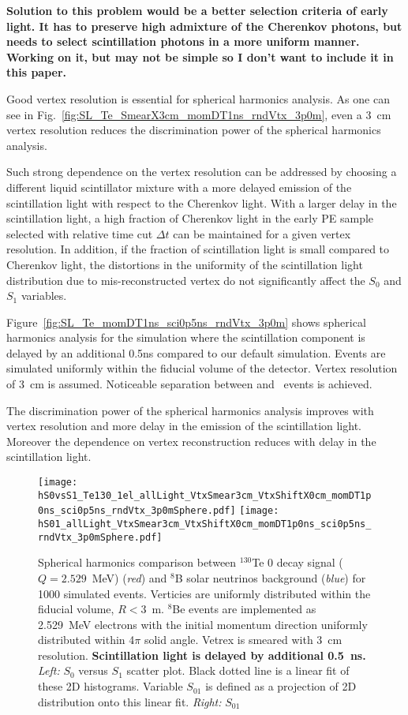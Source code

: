 {\bf Solution to this problem would be a better selection criteria of
  early light. It has to preserve high admixture of the Cherenkov
  photons, but needs to select scintillation photons in a more uniform
  manner. Working on it, but may not be simple so I don't want to
  include it in this paper.}

Good vertex resolution is essential for spherical harmonics analysis. As one can see in Fig.~\ref{fig:SL_Te_SmearX3cm_momDT1ns_rndVtx_3p0m}, even a 3~cm vertex resolution reduces the discrimination power of the spherical harmonics analysis.

Such strong dependence on the vertex resolution can be
addressed by choosing a different liquid scintillator mixture with a
more delayed emission of the scintillation light with respect to the Cherenkov light. With a larger delay in the scintillation light, a high fraction of Cherenkov light in the early PE sample selected with relative time cut $\Delta t$ can be maintained for a given vertex resolution. In addition, if the fraction of scintillation light is small compared to Cherenkov light, the distortions in the uniformity of the scintillation light distribution due to mis-reconstructed vertex do not significantly affect the $S_0$ and $S_1$ variables.

Figure~\ref{fig:SL_Te_momDT1ns_sci0p5ns_rndVtx_3p0m} shows
spherical harmonics analysis for the simulation where the
scintillation component is delayed by an additional 0.5ns compared to our default simulation. Events are simulated uniformly within the fiducial volume of the detector. Vertex resolution of 3~cm is assumed. Noticeable separation between \nbb and \B~events is achieved.

The discrimination power of the spherical harmonics analysis improves with vertex resolution and more delay in the emission of the scintillation light. Moreover the dependence on vertex reconstruction reduces with delay in the scintillation light. 

\begin{figure*}[h]
  \centering
  \texttt{[image: hS0vsS1\_Te130\_1el\_allLight\_VtxSmear3cm\_VtxShiftX0cm\_momDT1p0ns\_sci0p5ns\_rndVtx\_3p0mSphere.pdf]}
  \texttt{[image: hS01\_allLight\_VtxSmear3cm\_VtxShiftX0cm\_momDT1p0ns\_sci0p5ns\_rndVtx\_3p0mSphere.pdf]}
  \caption{Spherical harmonics comparison between $^{130}$Te 0{\nbb}
    decay signal ($Q=2.529$~MeV) (\emph{red}) and $^{8}$B solar
    neutrinos background (\emph{blue}) for 1000 simulated
    events. Verticies are uniformly distributed within the fiducial
    volume, $R<3$~m. $^8$Be events are implemented as 2.529~MeV
    electrons with the initial momentum direction uniformly
    distributed within 4$\pi$ solid angle. Vetrex is smeared with 3~cm
    resolution. {\bf Scintillation light is delayed by additional
      0.5~ns.} \emph{Left:} $S_0$ versus $S_1$ scatter plot. Black dotted
    line is a linear fit of these 2D histograms. Variable $S_{01}$ is
    defined as a projection of 2D distribution onto this linear
    fit. \emph{Right:} $S_{01}$}
\label{fig:SL_Te_SmearX3cm_momDT1ns_sci0p5ns_rndVtx_3p0m}
\end{figure*}

